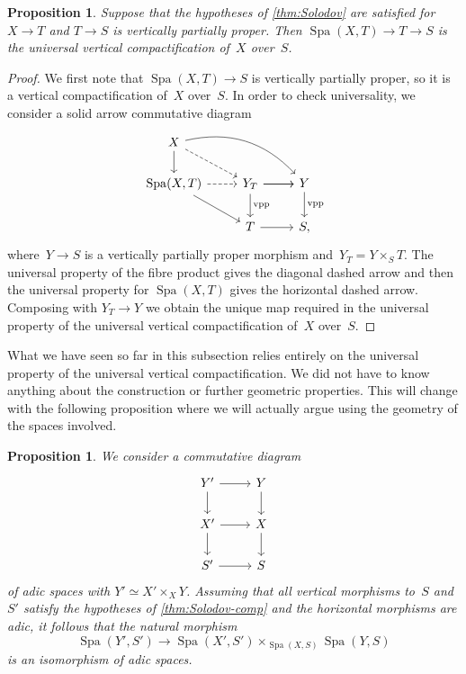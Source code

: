 \documentclass[a4paper,twoside,11pt,reqno]{amsart}
\DeclareMathOperator{\Spa}{Spa}
\newtheorem{prop}[thm]{Proposition}
\theoremstyle{definition}
\numberwithin{equation}{subsection}
\begin{document}
\begin{prop} \label{prop:Spa-iso-vpp}
    Suppose that the hypotheses of \cref{thm:Solodov} are satisfied for $X \to T$ and $T \to S$ is vertically partially proper.
    Then $\Spa(X,T) \to T \to S$ is the universal vertical compactification of~$X$ over~$S$.
\end{prop}

\begin{proof}
    We first note that $\Spa(X,T) \to S$ is vertically partially proper, so it is a vertical compactification of~$X$ over~$S$.
    In order to check universality, we consider a solid arrow commutative diagram
    \[
        \begin{tikzcd}
             X  \ar[drr,bend left]   \ar[dr,dashed] \ar[d]  \\
             \Spa(X,T) \ar[r,dashed] \ar[dr] & Y_T \ar[r] \ar[d,"\rm vpp"] \ar[r] & Y \ar[d,"\rm vpp"] \\
             & T \ar[r] & S,
        \end{tikzcd}
    \]
    where~$Y \to S$ is a vertically partially proper morphism and~$Y_T = Y \times_S T$.
    The universal property of the fibre product gives the diagonal dashed arrow and then the universal property for $\Spa(X,T)$ gives the horizontal dashed arrow.
    Composing with $Y_T \to Y$ we obtain the unique map required in the universal property of the universal vertical compactification of~$X$ over~$S$.
\end{proof}

What we have seen so far in this subsection relies entirely on the universal property of the universal vertical compactification.
We did not have to know anything about the construction or further geometric properties.
This will change with the following proposition where we will actually argue using the geometry of the spaces involved.

\begin{prop} \label{prop:comp-fibre-product}
    We consider a commutative diagram
        \[ 
            \begin{tikzcd}
                Y'\ar[r] \ar[d] & Y \ar[d] \\
                X'\ar[r] \ar[d] & X \ar[d] \\
                S'\ar[r]  & S
            \end{tikzcd}
        \]
    of adic spaces with $Y' \simeq X' \times_X Y$.
    Assuming that all vertical morphisms to~$S$ and~$S'$ satisfy the hypotheses of \cref{thm:Solodov-comp} and the horizontal morphisms  are adic, it follows that the natural morphism
    \[
     \Spa(Y',S') \longrightarrow \Spa(X',S') \times_{\Spa(X,S)} \Spa(Y,S)
    \]
    is an isomorphism of adic spaces.
\end{prop}
\end{document}
